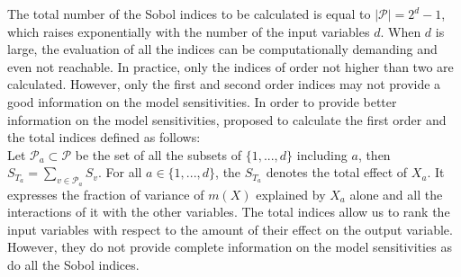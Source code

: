 The total number of the Sobol indices to be calculated is equal to $\vert\mathcal{P}\vert=2^d-1$, which raises exponentially with the number of the input variables $d$. When $d$ is large, the evaluation of all the indices can be computationally demanding and even not reachable. 
In practice, only the indices of order not higher than two are calculated.  
However, only the first and second order indices may not provide a good information on the model sensitivities. In order to provide better information on the model sensitivities, \citet{HOMMA19961} proposed to calculate the first order and the total indices defined as follows:\\
Let $\mathcal{P}_a\subset\mathcal{P}$ be the set of all the subsets of $\{1,...,d\}$ including $a$, then $S_{T_a}=\sum_{v\in\mathcal{P}_a}S_v$.
For all $a\in\{1,...,d\}$, the $S_{T_a}$ denotes the total effect of $X_a$. It expresses the fraction of variance of $m(X)$ explained by $X_a$ alone and all the interactions of it with the other variables.
The total indices allow us to rank the input variables with respect to the amount of their effect on the output variable. However, they do not provide complete information on the model sensitivities as do all the Sobol indices.

